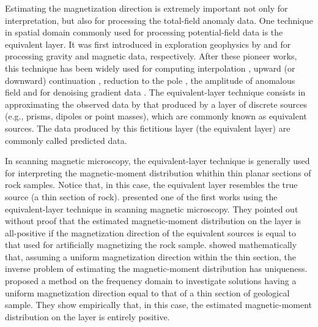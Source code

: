 Estimating the magnetization direction is extremely important not only for interpretation, 
but also for processing the total-field anomaly data. One technique in spatial domain 
commonly used for processing potential-field data is the equivalent layer. It was first introduced 
in exploration geophysics by \cite{dampney1969} and \cite{emilia_massey_1974} for processing 
gravity and magnetic data, respectively. After these pioneer works, this technique has been widely 
used for computing interpolation \citep{cordell_1992, mendonca-silva_1994, barnes-lumley_2011, siqueira_etal_2017}, 
upward (or downward) continuation  \citep{hansen-miyazaki_1984, li-oldenburg_2010}, reduction to the pole 
\citep{silva_1986, leao-silva_1989, guspi-novara_2009, oliveirajr-etal_2013}, the amplitude of 
anomalous field \citep{li_li_2014} and for denoising gradient data \citep{martinez_li_2016}. 
The equivalent-layer technique consists in approximating the observed data by that produced by a 
layer of discrete sources (e.g., prisms, dipoles or point masses), which are commonly known as 
equivalent sources. The data produced by this fictitious layer (the equivalent layer) are commonly
called predicted data.

In scanning magnetic microscopy, the equivalent-layer technique is generally used for interpreting 
the magnetic-moment distribution whithin thin planar sections of rock samples. Notice that, in this case, 
the equivalent layer resembles the true source (a thin section of rock). 
\cite{weiss2007} presented one of the first works using the equivalent-layer technique in scanning magnetic microscopy.
They pointed out without proof that the estimated magnetic-moment distribution on the layer is all-positive if 
the magnetization direction of the equivalent sources is equal to that used for artificially magnetizing the rock sample. 
\cite{baratchart2013} showed mathematically that, assuming a uniform magnetization direction within the thin section, 
the inverse problem of estimating the magnetic-moment distribution has uniqueness. 
\cite{lima2013} proposed a method on the frequency domain to investigate solutions having a uniform magnetization 
direction equal to that of a thin section of geological sample. They show empirically 
that, in this case, the estimated magnetic-moment distribution on the layer is entirely positive. 

